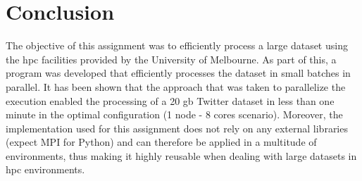 \documentclass[paper=a4, fontsize=11pt]{scrartcl}
\numberwithin{equation}{section}		%
\numberwithin{figure}{section}			%
\numberwithin{table}{section}				%
\begin{document}
\section{Conclusion}
The objective of this assignment was to efficiently process a large dataset using the \acrshort{hpc} facilities provided by the University of Melbourne. As part of this, a program was developed that efficiently processes the dataset in small batches in parallel. It has been shown that the approach that was taken to parallelize the execution enabled the processing of a 20 \acrshort{gb} Twitter dataset in less than one minute in the optimal configuration (1 node - 8 cores scenario).
\newline
Moreover, the implementation used for this assignment does not rely on any external libraries (expect MPI for Python) and can therefore be applied in a multitude of environments, thus making it highly reusable when dealing with large datasets in \acrshort{hpc} environments.

\printbibliography[heading=bibintoc]


\end{document}
